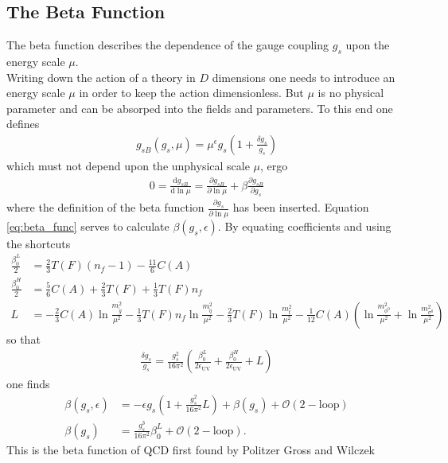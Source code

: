 \subsection{The Beta Function}\label{sec:beta_function}
The beta function describes the dependence of the gauge coupling $g_s$ upon the energy scale $\mu$.\\
Writing down the action of a theory in $D$ dimensions one needs to introduce an energy scale $\mu$ in order to keep the action dimensionless. But $\mu$ is no physical parameter and can be absorped into the fields and parameters. To this end one defines
\begin{align}
g_{sB}(g_s, \mu) = \mu^\epsilon g_s \left( 1 + \frac{\delta g_s}{g_s} \right)
\end{align}
which must not depend upon the unphysical scale $\mu$, ergo
\begin{align}
0 = \frac{\mathrm{d}g_{sB}}{\mathrm{d}\ln\mu} = \frac{\partial g_{sB}}{\partial \ln\mu} + \beta \frac{\partial g_{sB}}{\partial g_s}\label{eq:beta_func}
\end{align}
where the definition of the beta function $\frac{\partial g_s}{\partial\ln\mu}$ has been inserted. Equation \ref{eq:beta_func} serves to calculate $\beta(g_s,\epsilon)$.  By equating coefficients and using the shortcuts
\begin{align*}
\frac{\beta_0^L}{2} &= \frac{2}{3}T(F)(n_f-1) - \frac{11}{6}C(A)\\
\frac{\beta_0^H}{2} &= \frac{5}{6}C(A) + \frac{2}{3}T(F) + \frac{1}{3}T(F)n_f\\
L &= - \frac{2}{3} C(A) \ln \frac{m_{\tilde{g}}^2}{\mu^2} - \frac{1}{3}T(F)n_f \ln \frac{m_{\tilde{q}}^2}{\mu^2} - \frac{2}{3}T(F) \ln \frac{m_t^2}{\mu^2}-\frac{1}{12} C(A) \left( \ln \frac{m_{\phi^0}^2}{\mu^2} + \ln \frac{m_{\sigma^0}^2}{\mu^2} \right)
\end{align*}
so that 
\begin{align}
\frac{\delta g_s}{g_s} = \frac{g_s^2}{16\pi^2}\left( \frac{\beta^L_0}{2\epsilon_{\mathrm{UV}}} + \frac{\beta^H_0}{2\epsilon_{\mathrm{UV}}} + L \right)
\end{align}
one finds
\begin{align}
\beta(g_s,\epsilon) &= -\epsilon g_s \left( 1 + \frac{g_s^2}{16\pi^2} L \right) + \beta(g_s) + \mathcal{O}(\mathrm{2-loop})\\
\beta(g_s) &= \frac{g_s^3}{16\pi^2} \beta_0^L + \mathcal{O}(\mathrm{2-loop}).
\end{align}
This is the beta function of QCD first found by Politzer \cite{Politzer:1973fx} Gross and Wilczek \cite{Gross:1973ju}




